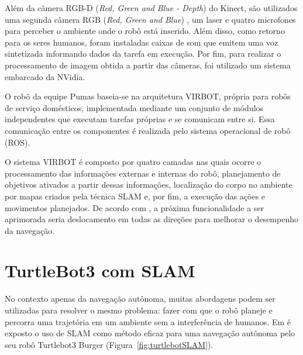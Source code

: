 Além da câmera RGB-D (\textit{Red, Green and Blue - Depth}) do Kinect, são utilizados uma segunda câmera RGB (\textit{Red, Green and Blue}) , um laser e quatro microfones para perceber o ambiente onde o robô está inserido. Além disso, como retorno para os seres humanos, foram instaladas caixas de som que emitem uma voz sintetizada informando dados da tarefa em execução. Por fim, para realizar o processamento de imagem obtida a partir das câmeras, foi utilizado um sistema embarcado da NVidia.


O robô da equipe Pumas baseia-se na arquitetura VIRBOT, própria para robôs de serviço domésticos, implementada mediante um conjunto de módulos independentes que executam tarefas próprias e se comunicam entre si. Essa comunicação entre os componentes é realizada pelo sistema operacional de robô (ROS). 

O sistema VIRBOT é composto por quatro camadas nas quais ocorre o processamento das informações externas e internas do robô,  planejamento de objetivos ativados a partir dessas informações, localização do corpo no ambiente por mapas criados pela técnica SLAM e, por fim, a execução das ações e movimentos planejados. De acordo com \citet{justina:2019}, a próxima funcionalidade a ser aprimorada seria deslocamento em todas as direções para melhorar o desempenho da navegação.

\section{TurtleBot3 com SLAM}
No contexto apenas da navegação autônoma, muitas abordagens podem ser utilizadas para resolver o mesmo problema: fazer com que o robô planeje e percorra uma trajetória em um ambiente sem a interferência de humanos. Em \citet{navegacaoSlam:2022} é exposto o uso de SLAM como método eficaz para uma navegação autônoma pelo seu robô Turtlebot3 Burger (Figura~\ref{fig:turtlebotSLAM}). 

